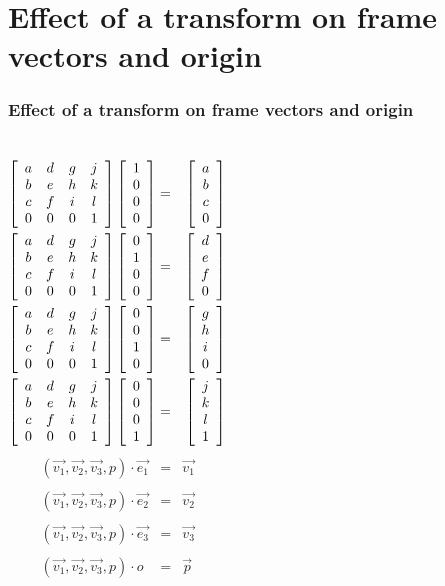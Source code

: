 \documentclass[slidestop,xcolor=pst,dvips]{beamer}
\newcommand{\sect}[1]{
\section{#1}
\begin{frame}[fragile]\frametitle{#1}
}
\begin{document}
\sect{Effect of a transform on frame vectors and origin}
\begin{columns}
{\small
\begin{eqnarray*}
\left[\begin{array}{cccc} a & d & g & j  \\ b & e & h & k \\ c & f & i & l \\0&0&0&1\end{array}\right]
\left[\begin{array}{c} 1\\0\\0 \\ 0\end{array}\right]
 &=& \left[\begin{array}{c} a\\b\\c \\ 0\end{array}\right]\\
\left[\begin{array}{cccc} a & d & g & j  \\ b & e & h & k \\ c & f & i & l \\0&0&0&1\end{array}\right]
\left[\begin{array}{c} 0\\1\\0 \\ 0\end{array}\right]
 &=& \left[\begin{array}{c} d\\e\\f \\ 0\end{array}\right]\\
\left[\begin{array}{cccc} a & d & g & j  \\ b & e & h & k \\ c & f & i & l \\0&0&0&1\end{array}\right]
\left[\begin{array}{c} 0\\0\\1 \\ 0\end{array}\right]
 &=& \left[\begin{array}{c} g\\h\\i \\ 0\end{array}\right]\\
\left[\begin{array}{cccc} a & d & g & j  \\ b & e & h & k \\ c & f & i & l \\0&0&0&1\end{array}\right]
\left[\begin{array}{c} 0\\0\\0 \\ 1\end{array}\right]
 &=& \left[\begin{array}{c} j\\k\\l \\ 1\end{array}\right]\\
\end{eqnarray*}
}
\pause
{}
\begin{eqnarray*}
(\vec{v_1}, \vec{v_2}, \vec{v_3}, {p})\cdot\vec{e_1} &=& \vec{v_1}\\\\
(\vec{v_1}, \vec{v_2}, \vec{v_3}, {p})\cdot\vec{e_2} &=& \vec{v_2}\\\\
(\vec{v_1}, \vec{v_2}, \vec{v_3}, {p})\cdot\vec{e_3} &=& \vec{v_3}\\\\
(\vec{v_1}, \vec{v_2}, \vec{v_3}, {p})\cdot{o} &=& \vec{p}
\end{eqnarray*}
\end{columns}
\end{frame}
\end{document}
